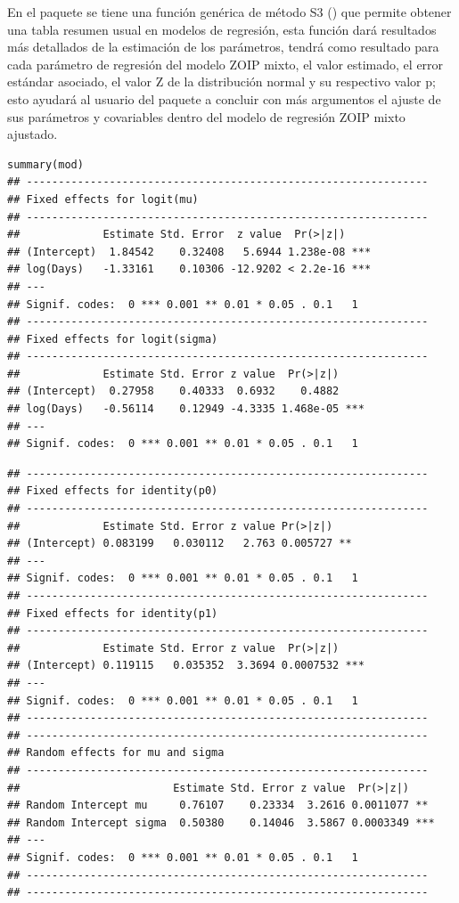 En el paquete  se tiene una funci\'{o}n gen\'{e}rica de m\'{e}todo S3 () que permite obtener una tabla resumen usual en modelos de regresi\'{o}n, esta funci\'{o}n dar\'{a} resultados m\'{a}s detallados de la estimaci\'{o}n de los par\'{a}metros, tendr\'{a} como resultado para cada par\'{a}metro de regresi\'{o}n del modelo ZOIP mixto, el valor estimado, el error est\'{a}ndar asociado, el valor Z de la distribuci\'{o}n normal y su respectivo valor p; esto ayudar\'{a} al usuario del paquete  a concluir con m\'{a}s argumentos el ajuste de sus par\'{a}metros y covariables dentro del modelo de regresi\'{o}n ZOIP mixto ajustado.


\begin{verbatim}
summary(mod)
## ---------------------------------------------------------------
## Fixed effects for logit(mu) 
## ---------------------------------------------------------------
##             Estimate Std. Error  z value  Pr(>|z|)    
## (Intercept)  1.84542    0.32408   5.6944 1.238e-08 ***
## log(Days)   -1.33161    0.10306 -12.9202 < 2.2e-16 ***
## ---
## Signif. codes:  0 *** 0.001 ** 0.01 * 0.05 . 0.1   1
## ---------------------------------------------------------------
## Fixed effects for logit(sigma) 
## ---------------------------------------------------------------
##             Estimate Std. Error z value  Pr(>|z|)    
## (Intercept)  0.27958    0.40333  0.6932    0.4882    
## log(Days)   -0.56114    0.12949 -4.3335 1.468e-05 ***
## ---
## Signif. codes:  0 *** 0.001 ** 0.01 * 0.05 . 0.1   1
\end{verbatim}
\begin{verbatim}
## ---------------------------------------------------------------
## Fixed effects for identity(p0) 
## ---------------------------------------------------------------
##             Estimate Std. Error z value Pr(>|z|)   
## (Intercept) 0.083199   0.030112   2.763 0.005727 **
## ---
## Signif. codes:  0 *** 0.001 ** 0.01 * 0.05 . 0.1   1
## ---------------------------------------------------------------
## Fixed effects for identity(p1) 
## ---------------------------------------------------------------
##             Estimate Std. Error z value  Pr(>|z|)    
## (Intercept) 0.119115   0.035352  3.3694 0.0007532 ***
## ---
## Signif. codes:  0 *** 0.001 ** 0.01 * 0.05 . 0.1   1
## ---------------------------------------------------------------
## ---------------------------------------------------------------
## Random effects for mu and sigma 
## ---------------------------------------------------------------
##                        Estimate Std. Error z value  Pr(>|z|)    
## Random Intercept mu     0.76107    0.23334  3.2616 0.0011077 ** 
## Random Intercept sigma  0.50380    0.14046  3.5867 0.0003349 ***
## ---
## Signif. codes:  0 *** 0.001 ** 0.01 * 0.05 . 0.1   1
## ---------------------------------------------------------------
## ---------------------------------------------------------------
\end{verbatim}

